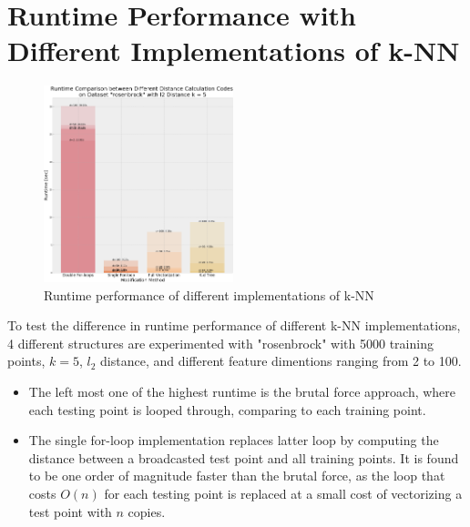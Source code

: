 \documentclass{article} %
\begin{document}
\vspace{0.4cm}
\section*{Runtime Performance with Different Implementations of k-NN} %
\begin{figure}
  \centering
  \includegraphics[width=0.49\textwidth]{kNNPerformance-TestSet-rosenbrock.png}
  \caption{Runtime performance of different implementations of k-NN}
\end{figure}

To test the difference in runtime performance of different k-NN implementations, 4 different structures are experimented with "rosenbrock" with 5000 training points, $k=5$, $l_2$ distance, and different feature dimentions ranging from 2 to 100.

\begin{itemize}
  \item The left most one of the highest runtime is the brutal force approach, where each testing point is looped through, comparing to each training point.

  \item The single for-loop implementation replaces latter loop by computing the distance between a broadcasted test point and all training points. It is found to be one order of magnitude faster than the brutal force, as the loop that costs $O(n)$ for each testing point is replaced at a small cost of vectorizing a test point with $n$ copies.
\end{itemize}
\end{document}
